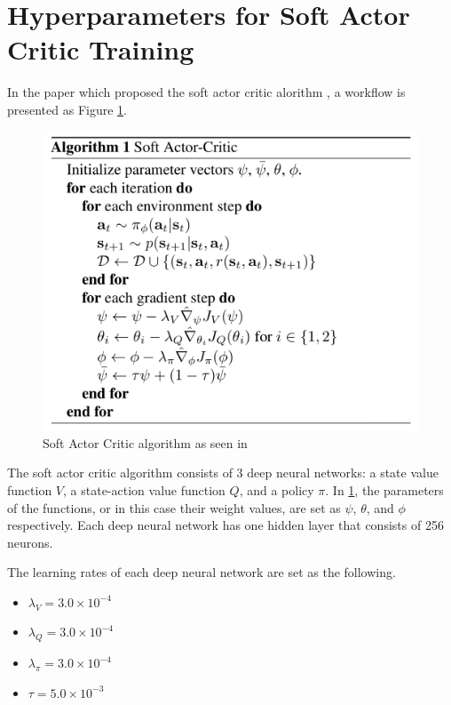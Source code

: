 \section{Hyperparameters for Soft Actor Critic Training}

In the paper which proposed the soft actor critic alorithm \cite{haarnoja2018soft}, a workflow is presented as Figure \ref{fig:sac_algorithm}.

  \begin{figure}[H]
      \centering
      \includegraphics[width=1\textwidth]{figures/external/sac_algorithm.png}
      \caption{Soft Actor Critic algorithm as seen in \cite{haarnoja2018soft}}
      \label{fig:sac_algorithm}
  \end{figure}

The soft actor critic algorithm consists of 3 deep neural networks: a state value function $V$, a state-action value function $Q$, and a policy $\pi$. In \ref{fig:sac_algorithm}, the parameters of the functions, or in this case their weight values, are set as $\psi$, $\theta$, and $\phi$ respectively. Each deep neural network has one hidden layer that consists of 256 neurons.

The learning rates of each deep neural network are set as the following.
  \begin{itemize}
    \item $\lambda_V = 3.0 \times 10^{-4}$
    \item $\lambda_Q = 3.0 \times 10^{-4}$
    \item $\lambda_\pi = 3.0 \times 10^{-4}$
    \item $\tau = 5.0 \times 10^{-3}$
  \end{itemize}


